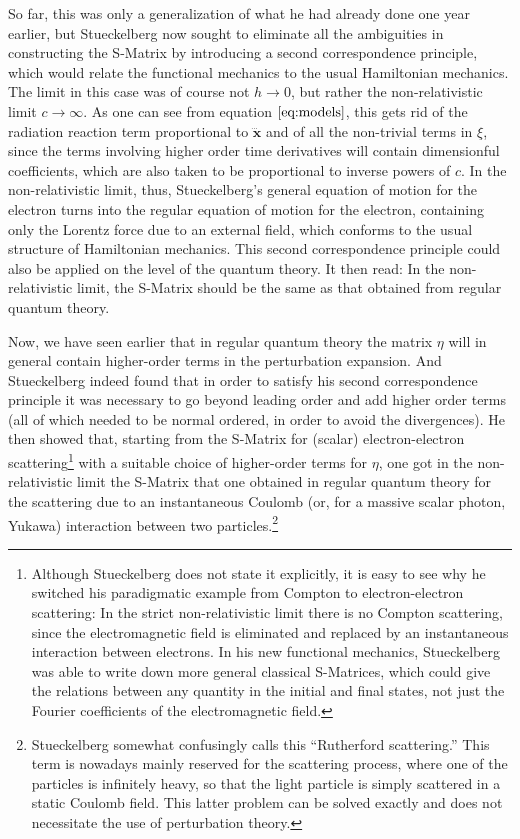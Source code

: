 \documentclass[12pt,a4paper]{article}
\begin{document}
So far, this was only a generalization of what he had already done one year earlier, but Stueckelberg now sought to eliminate all the ambiguities in constructing the S-Matrix by introducing a second correspondence principle, which would relate the functional mechanics to the usual Hamiltonian mechanics. The limit in this case was of course not $h \rightarrow 0$, but rather the non-relativistic limit $c \rightarrow \infty$. As one can see from equation $\ref{eq:models}$, this gets rid of the radiation reaction term proportional to $\dddot{\mathbf{x}}$ and of all the non-trivial terms in $\xi$, since the terms involving higher order time derivatives will contain dimensionful coefficients, which are also taken to be proportional to inverse powers of $c$. In the non-relativistic limit, thus, Stueckelberg's general equation of motion for the electron turns into the regular equation of motion for the electron, containing only the Lorentz force due to an external field, which conforms to the usual structure of Hamiltonian mechanics. This second correspondence principle could also be applied on the level of the quantum theory. It then read: In the non-relativistic limit, the S-Matrix should be the same as that obtained from regular quantum theory.

Now, we have seen earlier that in regular quantum theory the matrix $\eta$ will in general contain higher-order terms in the perturbation expansion. And Stueckelberg indeed found that in order to satisfy his second correspondence principle it was necessary to go beyond leading order and add higher order terms (all of which needed to be normal ordered, in order to avoid the divergences). He then showed that, starting from the S-Matrix for (scalar) electron-electron scattering\footnote{Although Stueckelberg does not state it explicitly, it is easy to see why he switched his paradigmatic example from Compton to electron-electron scattering: In the strict non-relativistic limit there is no Compton scattering, since the electromagnetic field is eliminated and replaced by an instantaneous interaction between electrons. In his  new functional mechanics, Stueckelberg was able to write down more general classical S-Matrices, which could give the relations between any quantity in the initial and final states, not just the Fourier coefficients of the electromagnetic field.} with a suitable choice of higher-order terms for $\eta$, one got in the non-relativistic limit the S-Matrix that one obtained in regular quantum theory for the scattering due to an instantaneous Coulomb (or, for a massive scalar photon, Yukawa) interaction between two particles.\footnote{Stueckelberg somewhat confusingly calls this ``Rutherford scattering.'' This term is nowadays mainly reserved for the scattering process, where one of the particles is infinitely heavy, so that the light particle is simply scattered in a static Coulomb field. This latter problem can be solved exactly and does not necessitate the use of perturbation theory.}
\end{document}
